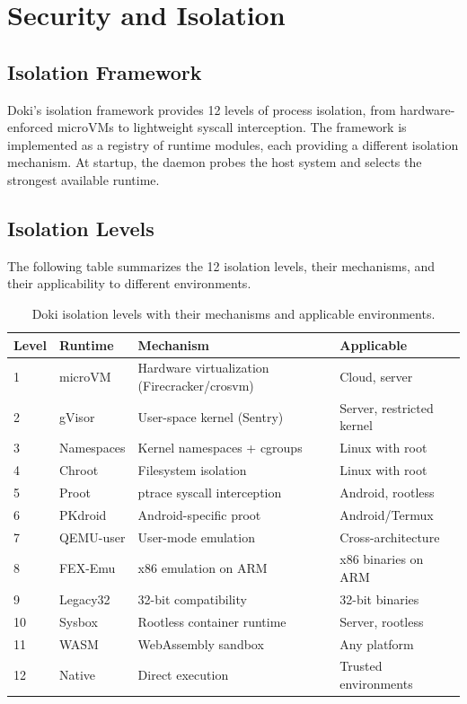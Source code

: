 \chapter{Security and Isolation}
\label{ch:isolation}

\section{Isolation Framework}
\label{sec:isolation-framework}

Doki's isolation framework provides 12 levels of process isolation,
from hardware-enforced microVMs to lightweight syscall interception.
The framework is implemented as a registry of runtime modules, each
providing a different isolation mechanism. At startup, the daemon
probes the host system and selects the strongest available runtime.

\section{Isolation Levels}
\label{sec:isolation-levels}

The following table summarizes the 12 isolation levels, their
mechanisms, and their applicability to different environments.

\begin{table}[htbp]
  \centering
  \caption{Doki isolation levels with their mechanisms and
   applicable environments.}
  \label{tab:isolation-levels}
  \small
  \begin{tabularx}{\textwidth}{l l l X}
    \toprule
    \textbf{Level} & \textbf{Runtime} & \textbf{Mechanism} & \textbf{Applicable} \\
    \midrule
    1  & microVM    & Hardware virtualization (Firecracker/crosvm) & Cloud, server \\
    2  & gVisor     & User-space kernel (Sentry) & Server, restricted kernel \\
    3  & Namespaces & Kernel namespaces + cgroups & Linux with root \\
    4  & Chroot     & Filesystem isolation & Linux with root \\
    5  & Proot      & ptrace syscall interception & Android, rootless \\
    6  & PKdroid    & Android-specific proot & Android/Termux \\
    7  & QEMU-user  & User-mode emulation & Cross-architecture \\
    8  & FEX-Emu    & x86 emulation on ARM & x86 binaries on ARM \\
    9  & Legacy32   & 32-bit compatibility & 32-bit binaries \\
    10 & Sysbox     & Rootless container runtime & Server, rootless \\
    11 & WASM       & WebAssembly sandbox & Any platform \\
    12 & Native     & Direct execution & Trusted environments \\
    \bottomrule
  \end{tabularx}
\end{table}

